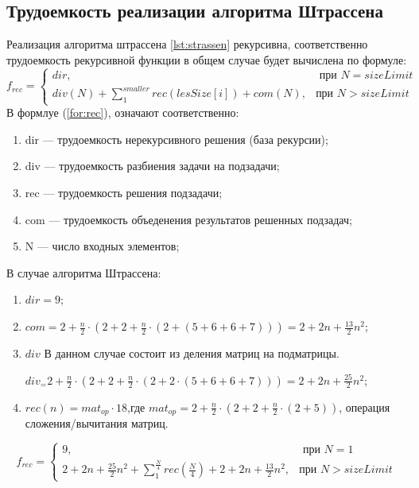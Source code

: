\subsection{Трудоемкость реализации алгоритма Штрассена}
Реализация алгоритма штрассена \ref{lst:strassen} рекурсивна, соответственно трудоемкость рекурсивной функции в общем случае будет вычислена по формуле:
\begin{equation}
	\label{for:rec}
	f_{rec} =
	\begin{cases}
		dir, & \text{ при $N = sizeLimit$}\\
		div(N) +\sum_{1}^{smaller}{rec(lesSize[i])} + com(N), & \text{при $N> sizeLimit$}
	\end{cases}
\end{equation}
В формлуе (\ref{for:rec}), означают соответственно:
\begin{enumerate}
	\item dir --- трудоемкость нерекурсивного решения (база рекурсии);
	\item div --- трудоемкость разбиения задачи на подзадачи;
	\item rec --- трудоемкость решения подзадачи;
	\item com --- трудоемкость объеденения результатов решенных подзадач;
	\item N --- число входных элементов;
\end{enumerate}


В случае алгоритма Штрассена:
\begin{enumerate}
	\item $dir  = 9$;
	\item $com =  2 + \frac{n}{2} \cdot (2 + 2 + \frac{n}{2} \cdot (2 +  (5 + 6 + 6 + 7))) = 2 +2n + \frac{13}{2}n^2$;
	\item $div$ В данном случае состоит из деления матриц на подматрицы.
	
	$div_ = 2 + \frac{n}{2} \cdot (2 + 2 + \frac{n}{2} \cdot (2 + 2 \cdot (5 + 6 + 6 + 7))) = 2 + 2n + \frac{25}{2}n^{2}$;

	\item $rec(n) = mat_{op} \cdot 18$,где $mat_{op} = 2 + \frac{n}{2} \cdot (2 + 2 + \frac{n}{2} \cdot (2 +5))$, операция сложения/вычитания матриц.
\end{enumerate}



\begin{equation}
	\label{for:rec_strassen}
	f_{rec} =
	\begin{cases}
		9, & \text{ при $N = 1$}\\
		 2+2n+ \frac{25}{2}n^2 +\sum_{1}^{\frac{N}{4}}{rec(\frac{N}{4})} + 2 +2n + \frac{13}{2}n^2, & \text{при $N> sizeLimit$}
	\end{cases}
\end{equation}

